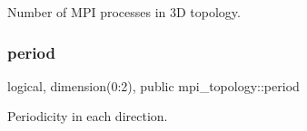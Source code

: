 Number of M\+PI processes in 3D topology. 

\mbox{\label{namespacempi__topology_ac24cb383bdfbdf566165cf78b03677aa}} 
\subsubsection{\texorpdfstring{period}{period}}
{\footnotesize\ttfamily logical, dimension(0\+:2), public mpi\+\_\+topology\+::period}



Periodicity in each direction. 

